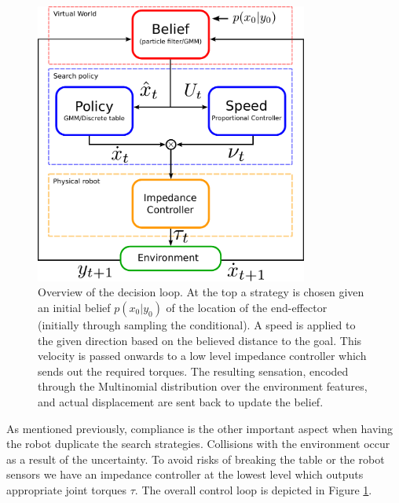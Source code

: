 %
%

\begin{figure}
\centering
  \includegraphics[width=0.8\textwidth]{./ch3-Search/Figures/Control_schematics}
  \caption{Overview of the decision loop. At the top a strategy is chosen given an initial belief
$p(x_{0}|y_{0})$ of the location of the end-effector (initially through sampling the conditional). 
A speed is applied to the given direction based on the believed distance
to the goal. This velocity is passed onwards to
a low level impedance controller which sends out the required torques. The
resulting sensation, encoded through the Multinomial distribution over
  the environment features, and actual displacement are sent back to update the
belief.}
  \label{fig:flow_chart}
\end{figure}

%
%
As mentioned previously, compliance is the other important aspect when having the robot duplicate the search strategies. 
Collisions with the environment occur as a result of the uncertainty. To avoid risks of breaking the table or the robot sensors we have an impedance controller
at the lowest level which outputs appropriate joint torques $\tau$. The overall control loop is depicted in Figure \ref{fig:flow_chart}.




